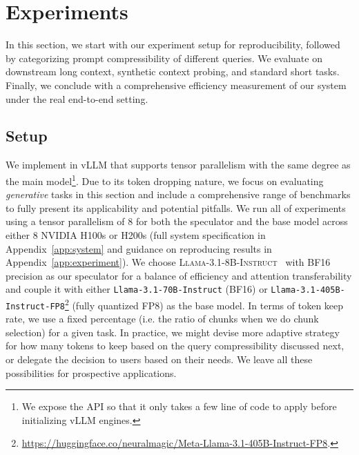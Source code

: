 \section{Experiments}
In this section, we start with our experiment setup for reproducibility, followed by categorizing prompt compressibility of different queries. We evaluate \ours{} on downstream long context, synthetic context probing, and standard short tasks. Finally, we conclude with a comprehensive efficiency measurement of our system under the real end-to-end setting. 

\subsection{Setup}
We implement \ours{} in vLLM that supports tensor parallelism with the same degree as the main model\footnote{We expose the API so that it only takes a few line of code to apply \ours{} before initializing vLLM engines.}. Due to its token dropping nature, we focus on evaluating \textit{generative} tasks in this section and include a comprehensive range of benchmarks to fully present its applicability and potential pitfalls. We run all of experiments using a tensor parallelism of 8 for both the speculator and the base model across either 8 NVIDIA H100s or H200s (full system specification in Appendix~\ref{app:system} and guidance on reproducing results in Appendix~\ref{app:experiment}). We choose \textsc{Llama-3.1-8B-Instruct}~\cite{grattafiori2024llama3herdmodels} with BF16 precision as our speculator for a balance of efficiency and attention transferability and couple it with either \texttt{Llama-3.1-70B-Instruct} (BF16) or \texttt{Llama-3.1-405B-Instruct-FP8}\footnote{\url{https://huggingface.co/neuralmagic/Meta-Llama-3.1-405B-Instruct-FP8}. } (fully quantized FP8) as the base model. In terms of token keep rate, we use a fixed percentage (i.e. the ratio of chunks when we do chunk selection) for a given task. In practice, we might devise more adaptive strategy for how many tokens to keep based on the query compressibility discussed next, or delegate the decision to users based on their needs. We leave all these possibilities for prospective applications. 


